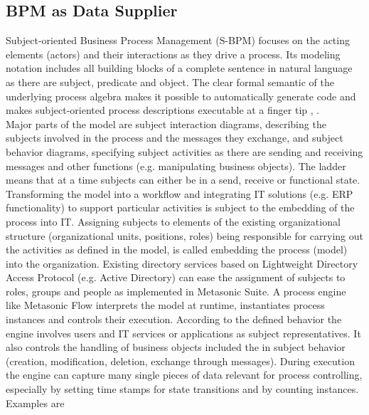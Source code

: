 \subsection{BPM as Data Supplier}
Subject-oriented Business Process Management (S-BPM) focuses on the acting elements (actors) and their interactions as they drive a process. Its modeling notation includes all building blocks of a complete sentence in natural language as there are subject, predicate and object. The clear formal semantic of the underlying process algebra makes it possible to automatically generate code and makes subject-oriented process descriptions executable at a finger tip \cite{Flei12}, \cite{article:HMD-S-BPM}.
\\
Major parts of the model are subject interaction diagrams, describing the subjects involved in the process and the messages they exchange, and subject behavior diagrams, specifying subject activities as there are sending and receiving messages and other functions (e.g. manipulating business objects). The ladder means that at a time subjects can either be in a send, receive or functional state. 
Transforming the model into a workflow and integrating IT solutions (e.g. ERP functionality) to support particular activities is subject to the embedding of the process into IT. Assigning subjects to elements of the existing organizational structure (organizational units, positions, roles) being responsible for carrying out the activities as defined in the model, is called embedding the process (model) into the organization. Existing directory services based on Lightweight Directory Access Protocol (e.g. Active Directory) can ease the assignment of subjects to roles, groups and people as implemented in Metasonic Suite.
A process engine like Metasonic Flow interprets the model at runtime, instantiates process instances and controls their execution. According to the defined behavior the engine involves users and IT services or applications as subject representatives. It also controls the handling of business objects included the in subject behavior (creation, modification, deletion, exchange through messages). During execution the engine can capture many single pieces of data relevant for process controlling, especially by setting time stamps for state transitions and by counting instances. Examples are 

